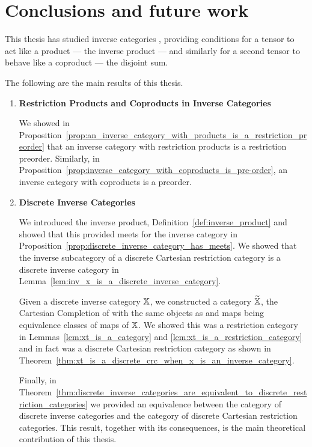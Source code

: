 \chapter{Conclusions and future work} %
\label{cha:conclusions_and_future_work}

This thesis has studied inverse categories \cite{cockett2002:restcategories1}, providing conditions
for a tensor to act like a product --- the inverse product --- and similarly for a second
tensor to behave like a coproduct --- the disjoint sum.

The following are the main results of this thesis.

\begin{enumerate}
\item \textbf{Restriction Products and Coproducts in Inverse Categories}

We showed in Proposition~\ref{prop:an_inverse_category_with_products_is_a_restriction_preorder} that
an inverse category with restriction products is a restriction preorder. Similarly, in
Proposition~\ref{prop:inverse_category_with_coproducts_is_pre-order}, an inverse category with
coproducts is a preorder.

\item \textbf{Discrete Inverse Categories}

We introduced the inverse product, Definition~\ref{def:inverse_product} and showed that this
provided meets for the inverse category in
Proposition~\ref{prop:discrete_inverse_category_has_meets}. We showed that the inverse subcategory
of a discrete Cartesian restriction category is a discrete inverse category in
Lemma~\ref{lem:inv_x_is_a_discrete_inverse_category}.

Given a discrete inverse category $\mathbb{X}$, we constructed a category $\widetilde{\mathbb{X}}$, the Cartesian Completion of
\X with the same objects as \X and maps being equivalence classes of maps of $\mathbb{X}$. We showed this was a
restriction category in Lemmas~\ref{lem:xt_is_a_category} and \ref{lem:xt_is_a_restriction_category}
and in fact was a discrete Cartesian restriction category as shown in
Theorem~\ref{thm:xt_is_a_discrete_crc_when_x_is_an_inverse_category}.

Finally, in
Theorem~\ref{thm:discrete_inverse_categories_are_equivalent_to_discrete_restriction_categories} we
provided an equivalence between the category of discrete inverse categories and the category
of discrete Cartesian restriction categories. This result, together with its consequences, is the
main theoretical contribution of this thesis.


\end{enumerate}
